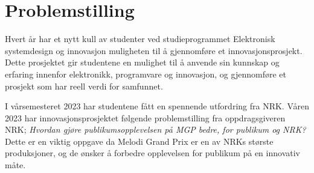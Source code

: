 
\section{Problemstilling}
\label{sec:problemstilling}

Hvert år har et nytt kull av studenter ved studieprogrammet Elektronisk systemdesign og innovasjon muligheten til å gjennomføre et innovasjonsprosjekt. Dette prosjektet gir studentene en mulighet til å anvende sin kunnskap og erfaring innenfor elektronikk, programvare og innovasjon, og gjennomføre et prosjekt som har reell verdi for samfunnet.

I vårsemesteret 2023 har studentene fått en spennende utfordring fra NRK.   Våren 2023 har innovasjonsprosjektet følgende problemstilling fra oppdragsgiveren NRK; \emph{Hvordan gjøre publikumsopplevelsen på MGP bedre, for publikum og NRK?} Dette er en viktig oppgave da Melodi Grand Prix er en av NRKs største produksjoner, og de ønsker å forbedre opplevelsen for publikum på en innovativ måte.